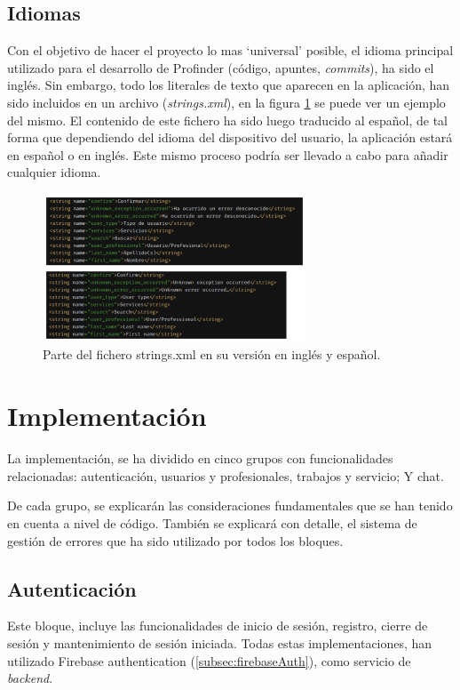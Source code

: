 \subsection{Idiomas}
Con el objetivo de hacer el proyecto lo mas ‘universal’ posible, el idioma principal utilizado para el desarrollo de Profinder (código, apuntes, \textit{commits}), ha sido el inglés. Sin embargo, todo los literales de texto que aparecen en la aplicación, han sido incluidos en un archivo (\textit{strings.xml}), en la figura \ref{fig:stringXml} se puede ver un ejemplo del mismo. El contenido de este fichero ha sido luego traducido al español, de tal forma que dependiendo del idioma del dispositivo del usuario, la aplicación estará en español o en inglés. Este mismo proceso podría ser llevado a cabo para añadir cualquier idioma.
\begin{figure}[h]
    \centering
    \includegraphics[width = 0.7\textwidth]{Imagenes/Fuentes/stringsXml.png}
    \caption{Parte del fichero strings.xml en su versión en inglés y español.}
    \label{fig:stringXml}
\end{figure}

\section{Implementación}
La implementación, se ha dividido en cinco grupos con funcionalidades relacionadas: autenticación, usuarios y profesionales, trabajos y servicio; Y chat. 

De cada grupo, se explicarán las consideraciones fundamentales que se han tenido en cuenta a nivel de código. También se explicará con detalle, el sistema de gestión de errores que ha sido utilizado por todos los bloques.
\subsection{Autenticación} 
Este bloque, incluye las funcionalidades de inicio de sesión, registro, cierre de sesión y mantenimiento de sesión iniciada. Todas estas implementaciones, han utilizado Firebase authentication (\ref{subsec:firebaseAuth}), como servicio de \textit{backend}.

